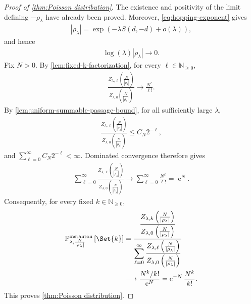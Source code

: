 \documentclass[a4paper,10pt]{article}
\numberwithin{equation}{section}
\theoremstyle{plain}
\theoremstyle{plain}
\theoremstyle{plain}
\theoremstyle{plain}
\theoremstyle{plain}
\theoremstyle{remark}
\theoremstyle{definition}
\newcommand{\ee}{\operatorname{e}}
\newcommand{\NN}{\mathbb{N}}
\newcommand{\PP}{\mathbb{P}}
\newcommand{\EE}{\mathbb{E}}
\newcommand\norm[1]{\left\lVert#1\right\rVert}
\newcommand{\abs}[1]{\left\lvert#1\right\rvert}
\newcommand{\eq}[1]{\begin{align*}#1\end{align*}}
\newcommand{\br}[1]{\left(#1\right)}
\begin{document}
\begin{proof}[Proof of \cref{thm:Poisson distribution}]
The existence and positivity of the limit defining $-\rho_\lambda$ have already been proved. Moreover, \cref{eq:hopping-exponent} gives
\eq{
\abs{\rho_\lambda}
=
\exp\br{-\lambda S(d,-d)+o(\lambda)},
}
and hence
\eq{
\log(\lambda)\abs{\rho_\lambda}\longrightarrow0.
}
Fix $N>0$. By \cref{lem:fixed-k-factorization}, for every $\ell\in\NN_{\geq0}$,
\eq{
\frac{Z_{\lambda,\ell}\br{\frac{N}{\abs{\rho_\lambda}}}}{Z_{\lambda,0}\br{\frac{N}{\abs{\rho_\lambda}}}}
\longrightarrow
\frac{N^\ell}{\ell!}.
}
By \cref{lem:uniform-summable-passage-bound}, for all sufficiently large $\lambda$,
\eq{
\frac{Z_{\lambda,\ell}\br{\frac{N}{\abs{\rho_\lambda}}}}{Z_{\lambda,0}\br{\frac{N}{\abs{\rho_\lambda}}}}
\leq
C_N2^{-\ell},
}
and $\sum_{\ell=0}^\infty C_N2^{-\ell}<\infty$. Dominated convergence therefore gives
\eq{
\sum_{\ell=0}^\infty
\frac{Z_{\lambda,\ell}\br{\frac{N}{\abs{\rho_\lambda}}}}{Z_{\lambda,0}\br{\frac{N}{\abs{\rho_\lambda}}}}
\longrightarrow
\sum_{\ell=0}^\infty\frac{N^\ell}{\ell!}
=
\ee^N.
}
Consequently, for every fixed $k\in\NN_{\geq0}$,
\begin{align}
\mathbb P_{\lambda,\frac{N}{\abs{\rho_\lambda}}}^{\rm instanton}\left[\Set{k}\right]
&=
\frac{
\displaystyle
\frac{Z_{\lambda,k}\br{\frac{N}{\abs{\rho_\lambda}}}}{Z_{\lambda,0}\br{\frac{N}{\abs{\rho_\lambda}}}}
}{
\displaystyle
\sum_{\ell=0}^\infty
\frac{Z_{\lambda,\ell}\br{\frac{N}{\abs{\rho_\lambda}}}}{Z_{\lambda,0}\br{\frac{N}{\abs{\rho_\lambda}}}}
}
\nonumber\\
&\longrightarrow
\frac{N^k/k!}{\ee^N}
=
\ee^{-N}\frac{N^k}{k!}.
\end{align}
This proves \cref{thm:Poisson distribution}.
\end{proof}
\appendix

\end{document}
